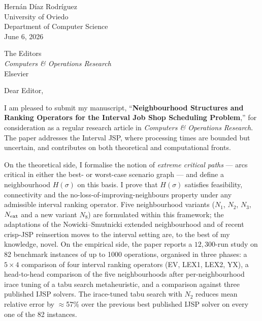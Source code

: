\documentclass[11pt,a4paper]{article}
\begin{document}
\begin{flushright}
Hern\'an D\'iaz Rodr\'iguez\\
University of Oviedo\\
Department of Computer Science\\[2pt]
June 6, 2026
\end{flushright}

\bigskip

\noindent
The Editors\\
\emph{Computers \& Operations Research}\\
Elsevier

\bigskip

\noindent Dear Editor,

I am pleased to submit my manuscript, ``\textbf{Neighbourhood Structures and
Ranking Operators for the Interval Job Shop Scheduling Problem},'' for
consideration as a regular research article in \emph{Computers \& Operations
Research}. The paper addresses the Interval JSP, where processing times are
bounded but uncertain, and contributes on both theoretical and computational
fronts.

On the theoretical side, I formalise the notion of \emph{extreme critical
paths} --- arcs critical in either the best- or worst-case scenario graph
--- and define a neighbourhood $H(\sigma)$ on this basis. I prove that
$H(\sigma)$ satisfies feasibility, connectivity and the
no-loss-of-improving-neighbours property under any admissible interval
ranking operator. Five neighbourhood variants ($N_1$, $N_2$, $N_3$,
$N_{\rm ext}$ and a new variant $N_8$) are formulated within this framework;
the adaptations of the Nowicki--Smutnicki extended neighbourhood and of
recent crisp-JSP reinsertion moves to the interval setting are, to the best
of my knowledge, novel. On the empirical side, the paper reports a
$12{,}300$-run study on 82 benchmark instances of up to 1000 operations,
organised in three phases: a $5{\times}4$ comparison of four interval
ranking operators (EV, LEX1, LEX2, YX), a head-to-head comparison of the
five neighbourhoods after per-neighbourhood irace tuning of a tabu search
metaheuristic, and a comparison against three published IJSP solvers. The
irace-tuned tabu search with $N_2$ reduces mean relative error by
$\approx$57\% over the previous best published IJSP solver on every one of
the 82 instances.
\end{document}
